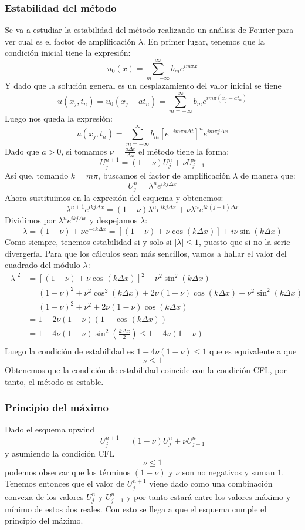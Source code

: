 \documentclass[spanish]{mathnotes}
\begin{document}
	\subsubsection{Estabilidad del método}
	Se va a estudiar la estabilidad del método realizando un análisis de Fourier para ver cual es el factor de amplificación $\lambda$.
	En primer lugar, tenemos que la condición inicial tiene la expresión:
	$$u_0(x) = \sum_{m=-\infty}^{\infty}b_m e^{im\pi x}$$
	Y dado que la solución general es un desplazamiento del valor inicial se tiene
	$$u(x_j, t_n) = u_0(x_j-a t_n)= \sum_{m=-\infty}^\infty b_me^{im\pi (x_j-a t_n)}$$
	Luego nos queda la expresión: 
	$$u(x_j, t_n) = \sum_{m=-\infty}^\infty b_m\left[e^{-im\pi a \Delta t}\right]^ne^{im\pi j \Delta x}$$
	Dado que $a>0$, si tomamos $\nu = \frac{a\Delta t}{\Delta x}$ el método tiene la forma:
	$$U_{j}^{n+1} = (1-\nu)U_{j}^{n}+\nu U_{j-1}^{n}$$
	Así que, tomando $k=m\pi$, buscamos el factor de amplificación $\lambda$ de manera que:
	$$U_{j}^{n}=\lambda ^n e^{ikj\Delta x}$$ 
	Ahora sustituimos en la expresión del esquema y obtenemos:
	$$\lambda^{n+1}e^{ikj\Delta x} = (1-\nu) \lambda ^n e^{ikj\Delta x}+\nu \lambda^ne^{ik(j-1)\Delta x}$$
	Dividimos por $\lambda^ne^{ikj\Delta x}$ y despejamos $\lambda$:
	$$\lambda = (1-\nu) + \nu e^{-ik\Delta x} = \left[(1-\nu)+\nu \cos(k\Delta x)\right] + i\nu \sin(k\Delta x)$$
	Como siempre, tenemos estabilidad si y solo si $|\lambda|\le 1$, puesto que si no la serie divergería. Para que los cálculos sean más sencillos, vamos a hallar el valor del cuadrado del módulo $\lambda$:
	\begin{align*}
		|\lambda|^2 &= \left[(1-\nu)+\nu \cos(k\Delta x)\right]^2 +\nu^2\sin^2(k\Delta x)\\
		&= (1-\nu)^2+\nu^2\cos^2(k\Delta x) + 2\nu(1-\nu)\cos(k\Delta x)+\nu^2 \sin^2(k\Delta x)\\
		&= (1-\nu)^2 + \nu^2 + 2\nu(1-\nu)\cos(k\Delta x)\\
		&= 1-2\nu(1-\nu)(1-\cos(k\Delta x))\\
		&= 1-4\nu (1-\nu)\sin^2\left(\frac{k\Delta x}{2}\right) \le 1-4\nu (1-\nu)\\
	\end{align*}
	Luego la condición de estabilidad es $1-4\nu (1-\nu)\le 1$ que es equivalente a que
	$$\nu \le 1$$
	Obtenemos que la condición de estabilidad coincide con la condición CFL, por tanto, el método es estable.
	\subsubsection{Principio del máximo}
	Dado el esquema upwind 
	$$U_{j}^{n+1} = (1-\nu)U_{j}^{n}+\nu U_{j-1}^{n}$$
	y asumiendo la condición CFL
	$$\nu \le 1$$
	podemos observar que los términos $(1-\nu)$ y $\nu$ son no negativos y suman $1$. Tenemos entonces que el valor de $U_j^{n+1}$ viene dado como una combinación convexa de los valores $U_j^n$ y $U_{j-1}^n$ y por tanto estará entre los valores máximo y mínimo de estos dos reales. Con esto se llega a que el esquema cumple el principio del máximo. 
\end{document}

